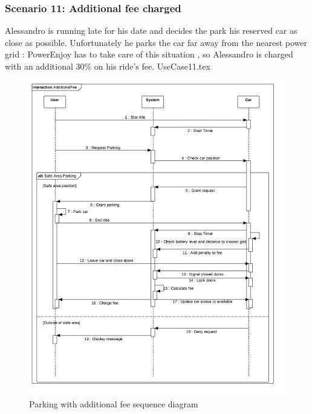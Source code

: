 \documentclass[12pt]{article}
\begin{document}
		\subsubsection{Scenario 11: Additional fee charged}
		Alessandro is running late for his date and decides the park his reserved car as close as 
		possible. Unfortunately he parks the car far away from the nearest power grid : PowerEnjoy 
		has to take care of this situation , so Alessandro is charged with an additional 30\% on his
		ride's fee.
		\FloatBarrier
		{UseCase11.tex}
		\newpage
		\begin{figure}[htbp]
		\caption{Parking with additional fee sequence diagram}
		\includegraphics[scale=0.49]{Images/SequenceDiagram/AdditionalFee.png}
 	 	\end{figure}
 	 	\clearpage
 	 	
\end{document}
